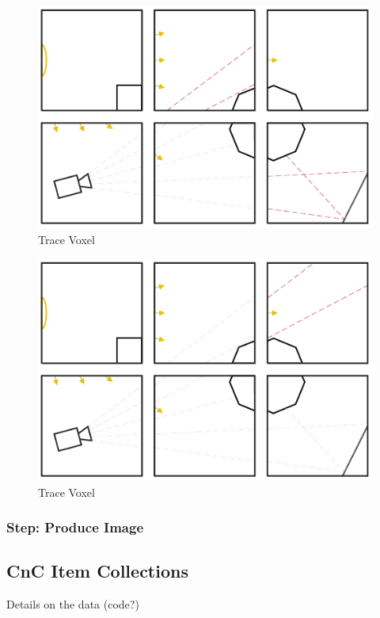 \documentclass{vgtc}                          %
\begin{document}
\begin{figure}[htb]
  \centering
  \includegraphics[width=\columnwidth]{drawings/Trace3.pdf}
  \caption{Trace Voxel}
\end{figure}

\begin{figure}[htb]
  \centering
  \includegraphics[width=\columnwidth]{drawings/Trace4.pdf}
  \caption{Trace Voxel}
\end{figure}

\subsubsection{Step: Produce Image}

\subsection{CnC Item Collections}
Details on the data (code?)
\end{document}
